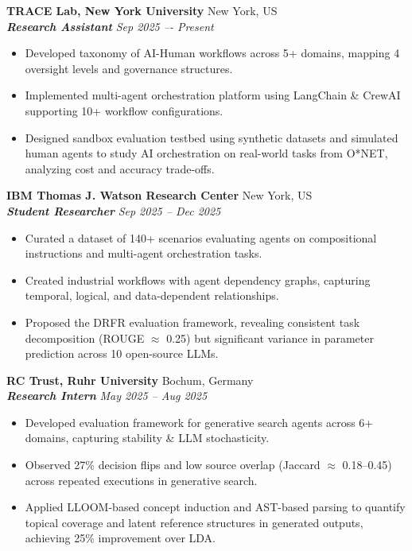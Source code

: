 \documentclass[a4paper,10pt]{article}
\begin{document}
{\color{boldcolor}\textbf{TRACE Lab, New York University}} 
\hfill  New York, US\\
{\color{lightboldcolor}\textbf{\textit{Research Assistant}}} \hfill \textit{\small Sep 2025 –- Present}
\begin{itemize}
    \item Developed taxonomy of AI-Human workflows across 5+ domains, mapping 4 oversight levels and governance structures.
    \item Implemented multi-agent orchestration platform using LangChain \& CrewAI supporting 10+ workflow configurations.
    \item Designed sandbox evaluation testbed using synthetic datasets and simulated human agents to study AI orchestration on real-world tasks from O*NET, analyzing cost and accuracy trade-offs.
\end{itemize}
\vspace{0.2cm}

{\color{boldcolor}\textbf{IBM Thomas J. Watson Research Center}} 
\hfill New York, US\\
{\color{lightboldcolor}\textbf{\textit{Student Researcher}}} \hfill \textit{\small Sep 2025 -- Dec 2025}
\begin{itemize}
    \item Curated a dataset of 140+ scenarios evaluating agents on compositional instructions and multi-agent orchestration tasks.
    \item Created industrial workflows with agent dependency graphs, capturing temporal, logical, and data-dependent relationships.
    \item Proposed the DRFR evaluation framework, revealing consistent task decomposition (ROUGE $\approx$ 0.25) but significant variance in parameter prediction across 10 open-source LLMs.
\end{itemize}
\vspace{0.2cm}

{\color{boldcolor}\textbf{RC Trust, Ruhr University}} \hfill Bochum, Germany\\
{\color{lightboldcolor}\textbf{\textit{Research Intern}}} \hfill \textit{\small May 2025 -- Aug 2025}
\begin{itemize}
    \item Developed evaluation framework for generative search agents across 6+ domains, capturing stability \& LLM stochasticity.
    \item Observed 27\% decision flips and low source overlap (Jaccard $\approx$ 0.18--0.45) across repeated executions in generative search.
    \item Applied LLOOM-based concept induction and AST-based parsing to quantify topical coverage and latent reference structures in generated outputs, achieving 25\% improvement over LDA.

\end{itemize}
\vspace{0.05cm}
\end{document}

